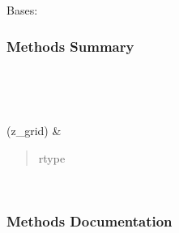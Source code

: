 \documentclass[letterpaper,10pt,english]{sphinxmanual}
\begin{document}
\begin{fulllineitems}
\label{\detokenize{api/seyfert.cosmology.bias.FiducialGrowthVoidBias:seyfert.cosmology.bias.FiducialGrowthVoidBias}}
\sphinxAtStartPar
Bases: {\hyperref[\detokenize{api/seyfert.cosmology.bias.BiasModel:seyfert.cosmology.bias.BiasModel}]{}}
\subsubsection*{Methods Summary}


\begin{savenotes}\sphinxatlongtablestart\begin{longtable}[c]{}
\hline

\endfirsthead

%
{}\\
\hline

\endhead

\hline
{}\\
\endfoot

\endlastfoot

\sphinxAtStartPar
{\hyperref[\detokenize{api/seyfert.cosmology.bias.FiducialGrowthVoidBias:seyfert.cosmology.bias.FiducialGrowthVoidBias.computeBias}]{}}(z\_grid)
&
\sphinxAtStartPar
\begin{quote}\begin{description}
\item[{rtype}] \leavevmode
\sphinxAtStartPar
{}

\end{description}\end{quote}

\\
\hline
\end{longtable}\sphinxatlongtableend\end{savenotes}
\subsubsection*{Methods Documentation}


\end{fulllineitems}
\end{document}
